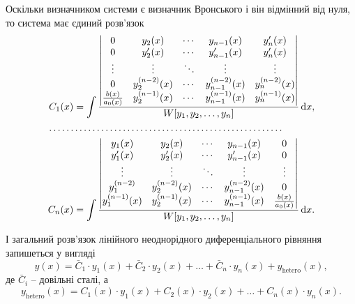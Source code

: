 Оскільки визначником системи є визначник Вронського і він відмінний від нуля, то система має єдиний розв’язок
\begin{equation*}
	\begin{aligned}
		C_1(x) &= \int \frac{\begin{vmatrix} 0 & y_2(x) & \cdots & y_{n - 1}(x) & y_n'(x) \\ 0 & y_2'(x) & \cdots & y_{n - 1}'(x) & y_n'(x) \\ \vdots & \vdots & \ddots & \vdots & \vdots \\ 0 & y_2^{(n - 2)}(x) & \cdots & y_{n - 1}^{(n - 2)}(x) & y_n^{(n - 2)}(x) \\ \frac{b(x)}{a_0(x)} & y_2^{(n - 1)}(x) & \cdots & y_{n - 1}^{(n - 1)}(x) & y_n^{(n - 1)}(x) \end{vmatrix}}{W[y_1, y_2, \ldots, y_n]} \mathop{}\!\mathrm{d} x, \\
		\ldots \ldots & \ldots \ldots \ldots \ldots \ldots \ldots \ldots \ldots \ldots \ldots \ldots \ldots \ldots \ldots \ldots \ldots \\
		C_n(x) &= \int \frac{\begin{vmatrix} y_1(x) & y_2(x) & \cdots & y_{n - 1}(x) & 0 \\ y_1'(x) & y_2'(x) & \cdots & y_{n - 1}'(x) & 0 \\ \vdots & \vdots & \ddots & \vdots & \vdots \\ y_1^{(n - 2)} & y_2^{(n - 2)}(x) & \cdots & y_{n - 1}^{(n - 2)}(x) & 0 \\ y_1^{(n - 1)}(x) & y_2^{(n - 1)}(x) & \cdots & y_{n - 1}^{(n - 1)}(x) & \frac{b(x)}{a_0(x)} \end{vmatrix}}{W[y_1, y_2, \ldots, y_n]} \mathop{}\!\mathrm{d} x.
	\end{aligned}
\end{equation*}

І загальний розв’язок лінійного неоднорідного диференціального рівняння запишеться у вигляді
\begin{equation*}
	y(x) = \bar C_1 \cdot y_1(x) + \bar C_2 \cdot y_2(x) + \ldots + \bar C_n \cdot y_n(x) + y_{\text{hetero}}(x),
\end{equation*}
де $\bar C_i$ -- довільні сталі, а
\begin{equation*}
	y_{\text{hetero}}(x) = C_1(x) \cdot y_1(x) + C_2(x) \cdot y_2(x) + \ldots + C_n(x) \cdot y_n(x).
\end{equation*}

